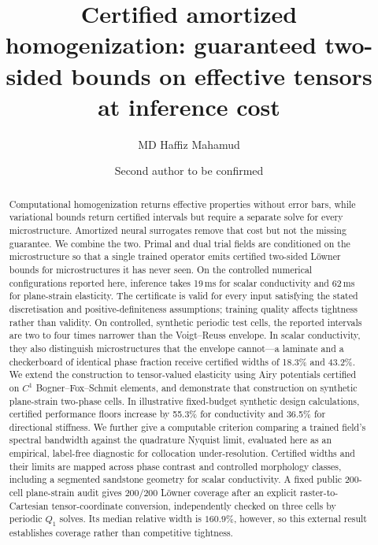 \documentclass[preprint,12pt]{elsarticle}
\begin{document}
\begin{frontmatter}

\title{Certified amortized homogenization: guaranteed two-sided bounds on
effective tensors at inference cost}

\author[a]{MD Haffiz Mahamud}
\author[a]{Second author to be confirmed}
\address[a]{Rajshahi University of Engineering \& Technology (RUET), Rajshahi, Bangladesh}

\begin{abstract}
Computational homogenization returns effective properties without error
bars, while variational bounds return certified intervals but require a
separate solve for every microstructure. Amortized neural surrogates remove
that cost but not the missing guarantee. We combine the two. Primal and
dual trial fields are conditioned on the microstructure so that a single
trained operator emits certified two-sided L\"owner bounds for
microstructures it has never seen. On the controlled numerical
configurations reported here, inference takes 19\,ms for scalar conductivity
and 62\,ms for plane-strain elasticity. The certificate is valid for every
input satisfying the stated discretisation and positive-definiteness
assumptions; training quality affects tightness rather than validity.
On controlled, synthetic periodic test cells, the reported intervals are two
to four times narrower than the Voigt--Reuss envelope. In scalar
conductivity, they also distinguish microstructures that the envelope
cannot---a laminate and a checkerboard of identical phase fraction receive
certified widths of 18.3\% and 43.2\%. We extend the construction to
tensor-valued elasticity using Airy potentials certified on $C^1$
Bogner--Fox--Schmit elements, and demonstrate that construction on synthetic
plane-strain two-phase cells. In illustrative fixed-budget synthetic design
calculations, certified performance floors increase by 55.3\% for
conductivity and 36.5\% for directional stiffness. We further give a
computable criterion comparing a trained field's spectral bandwidth against
the quadrature Nyquist limit, evaluated here as an empirical, label-free
diagnostic for collocation under-resolution. Certified widths and their
limits are mapped across phase contrast and controlled morphology classes,
including a segmented sandstone geometry for scalar conductivity.
A fixed public $200$-cell plane-strain audit gives $200/200$ L\"owner
coverage after an explicit raster-to-Cartesian tensor-coordinate conversion,
independently checked on three cells by periodic $Q_1$ solves. Its median
relative width is $160.9\%$, however, so this external result establishes
coverage rather than competitive tightness.
\end{abstract}


\end{frontmatter}
\end{document}

